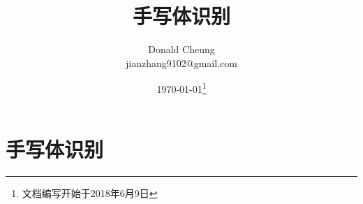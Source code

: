 \ifx\projectsnotes\undefined
    \providecommand{\notesroot}{../..}
    \providecommand{\ocrroot}{.}

    \title{手写体识别}
    \author{Donald Cheung\\jianzhang9102@gmail.com}
    \date{\today\footnote{文档编写开始于2018年6月9日}}

    
\else
    \providecommand{\ocrroot}{\projectsroot/ocr}
\fi

\chapter{手写体识别}

\ifx\projectsnotes\undefined
    
\fi
